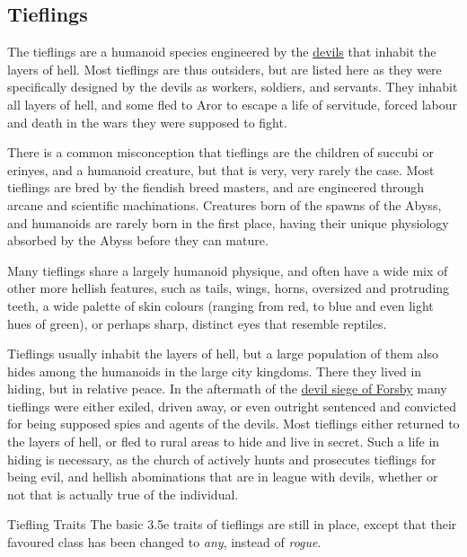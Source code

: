 \subsection{Tieflings}
\label{sec:Tieflings}

The tieflings are a humanoid species engineered by the
\hyperref[sec:Devils]{devils} that inhabit the layers of hell. Most tieflings
are thus outsiders, but are listed here as they were specifically designed by
the devils as workers, soldiers, and servants. They inhabit all layers of
hell, and some fled to Aror to escape a life of servitude, forced labour and
death in the wars they were supposed to fight.

There is a common misconception that tieflings are the children of succubi or
erinyes, and a humanoid creature, but that is very, very rarely the case. Most
tieflings are bred by the fiendish breed masters, and are engineered through
arcane and scientific machinations. Creatures born of the spawns of the Abyss,
and humanoids are rarely born in the first place, having their unique
physiology absorbed by the Abyss before they can mature.

Many tieflings share a largely humanoid physique, and often have a wide mix of
other more hellish features, such as tails, wings, horns, oversized and
protruding teeth, a wide palette of skin colours (ranging from red, to blue
and even light hues of green), or perhaps sharp, distinct eyes that resemble
reptiles.

Tieflings usually inhabit the layers of hell, but a large population of them
also hides among the humanoids in the large city kingdoms. There they lived
in hiding, but in relative peace. In the aftermath of the \hyperref[sec:Devil
  Siege]{devil siege of Forsby} many tieflings were either exiled, driven
away, or even outright sentenced and convicted for being supposed spies and
agents of the devils. Most tieflings either returned to the layers of hell, or
fled to rural areas to hide and live in secret. Such a life in hiding is
necessary, as the church of  actively hunts and prosecutes
tieflings for being evil, and hellish abominations that are in league with
devils, whether or not that is actually true of the individual.

\begin{35e}{Tiefling Traits}
  The basic 3.5e traits of tieflings are still in place, except that their
  favoured class has been changed to \emph{any}, instead of \emph{rogue}.
\end{35e}
